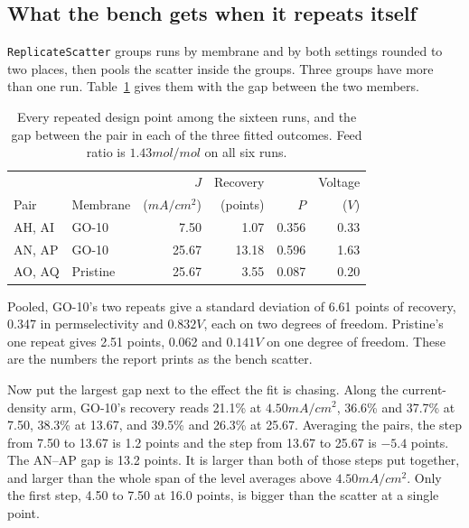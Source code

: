\subsection{What the bench gets when it repeats itself}
\label{sec:limits:replicates}

\texttt{ReplicateScatter} groups runs by membrane and by both settings rounded to two
places, then pools the scatter inside the groups. Three groups have more than one run.
Table~\ref{tab:limits:replicates} gives them with the gap between the two members.

\begin{table}[htbp]
  \centering
  \caption{Every repeated design point among the sixteen runs, and the gap between the
    pair in each of the three fitted outcomes. Feed ratio is $1.43\unit{mol/mol}$ on all
    six runs.}
  \label{tab:limits:replicates}
  \begin{tabular}{l l r r r r}
    \toprule
    & & $J$ & Recovery & & Voltage \\
    Pair & Membrane & ($\unit{mA/cm^2}$) & (points) & $P$ & ($\unit{V}$) \\
    \midrule
    AH, AI & GO-10    & 7.50  & 1.07  & 0.356 & 0.33 \\
    AN, AP & GO-10    & 25.67 & 13.18 & 0.596 & 1.63 \\
    AO, AQ & Pristine & 25.67 & 3.55  & 0.087 & 0.20 \\
    \bottomrule
  \end{tabular}
\end{table}

Pooled, GO-10's two repeats give a standard deviation of 6.61 points of recovery, 0.347
in permselectivity and $0.832\unit{V}$, each on two degrees of freedom. Pristine's one
repeat gives 2.51 points, 0.062 and $0.141\unit{V}$ on one degree of freedom. These are
the numbers the report prints as the bench scatter.

Now put the largest gap next to the effect the fit is chasing. Along the current-density
arm, GO-10's recovery reads 21.1\% at $4.50\unit{mA/cm^2}$, 36.6\% and 37.7\% at 7.50,
38.3\% at 13.67, and 39.5\% and 26.3\% at 25.67. Averaging the pairs, the step from 7.50
to 13.67 is 1.2 points and the step from 13.67 to 25.67 is $-5.4$ points. The AN--AP gap
is 13.2 points. It is larger than both of those steps put together, and larger than the
whole span of the level averages above $4.50\unit{mA/cm^2}$. Only the first step, 4.50 to
7.50 at 16.0 points, is bigger than the scatter at a single point.

